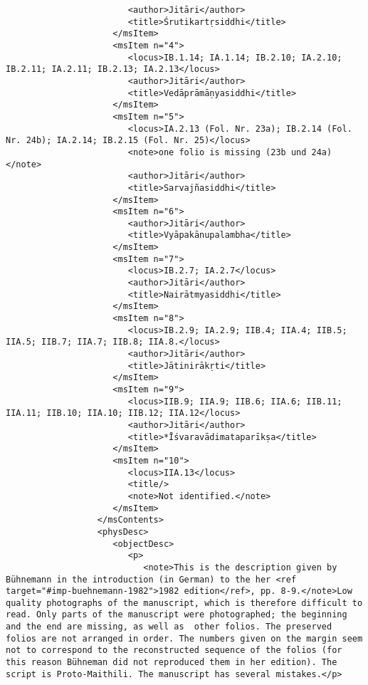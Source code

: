 \documentclass[article,12pt,a4paper]{memoir}%
\begin{document}
\begin{verbatim}
                        <author>Jitāri</author>
                        <title>Śrutikartṛsiddhi</title>
                     </msItem>
                     <msItem n="4">
                        <locus>IB.1.14; IA.1.14; IB.2.10; IA.2.10; IB.2.11; IA.2.11; IB.2.13; IA.2.13</locus>
                        <author>Jitāri</author>
                        <title>Vedāprāmāṇyasiddhi</title>
                     </msItem>
                     <msItem n="5">
                        <locus>IA.2.13 (Fol. Nr. 23a); IB.2.14 (Fol. Nr. 24b); IA.2.14; IB.2.15 (Fol. Nr. 25)</locus>
                        <note>one folio is missing (23b und 24a)</note>
                        <author>Jitāri</author>
                        <title>Sarvajñasiddhi</title>
                     </msItem>
                     <msItem n="6">
                        <author>Jitāri</author>
                        <title>Vyāpakānupalambha</title>
                     </msItem>
                     <msItem n="7">
                        <locus>IB.2.7; IA.2.7</locus>
                        <author>Jitāri</author>
                        <title>Nairātmyasiddhi</title>
                     </msItem>
                     <msItem n="8">
                        <locus>IB.2.9; IA.2.9; IIB.4; IIA.4; IIB.5; IIA.5; IIB.7; IIA.7; IIB.8; IIA.8.</locus>
                        <author>Jitāri</author>
                        <title>Jātinirākṛti</title>
                     </msItem>
                     <msItem n="9">
                        <locus>IIB.9; IIA.9; IIB.6; IIA.6; IIB.11; IIA.11; IIB.10; IIA.10; IIB.12; IIA.12</locus>
                        <author>Jitāri</author>
                        <title>*Īśvaravādimataparīkṣa</title>
                     </msItem>
                     <msItem n="10">
                        <locus>IIA.13</locus>
                        <title/>
                        <note>Not identified.</note>
                     </msItem>
                  </msContents>
                  <physDesc>
                     <objectDesc>
                        <p>
                           <note>This is the description given by Bühnemann in the introduction (in German) to the her <ref target="#imp-buehnemann-1982">1982 edition</ref>, pp. 8-9.</note>Low quality photographs of the manuscript, which is therefore difficult to read. Only parts of the manuscript were photographed; the beginning and the end are missing, as well as  other folios. The preserved folios are not arranged in order. The numbers given on the margin seem not to correspond to the reconstructed sequence of the folios (for this reason Bühneman did not reproduced them in her edition). The script is Proto-Maithili. The manuscript has several mistakes.</p>

\end{verbatim}
\end{document}
